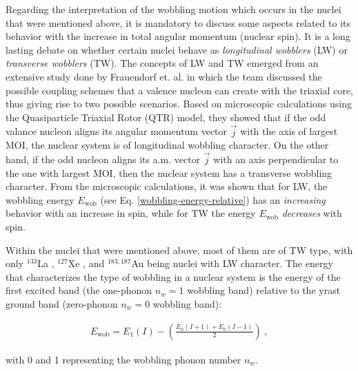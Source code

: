 \documentclass[11pt]{article}
\begin{document}
Regarding the interpretation of the wobbling motion which occurs in the nuclei that were mentioned above, it is mandatory to discuss some aspects related to its behavior with the increase in total angular momentum (nuclear spin). It is a long lasting debate on whether certain nuclei behave as \emph{longitudinal wobblers} (LW) or \emph{transverse wobblers} (TW). The concepts of LW and TW emerged from an extensive study done by Frauendorf et. al. \cite{frauendorf2014transverse} in which the team discussed the possible coupling schemes that a valence nucleon can create with the triaxial core, thus giving rise to two possible scenarios. Based on microscopic calculations using the Quasiparticle Triaxial Rotor (QTR) model, they showed that if the odd valance nucleon aligns its angular momentum vector $\vec{j}$ with the axis of largest MOI, the nuclear system is of longitudinal wobbling character. On the other hand, if the odd nucleon aligns its a.m. vector $\vec{j}$ with an axis perpendicular to the one with largest MOI, then the nuclear system has a transverse wobbling character. From the microscopic calculations, it was shown that for LW, the wobbling energy $E_\text{wob}$ (see Eq. \ref{wobbling-energy-relative}) has an \emph{increasing} behavior with an increase in spin, while for TW the energy $E_\text{wob}$ \emph{decreases} with spin.

Within the nuclei that were mentioned above, most of them are of TW type, with only $^{133}$La \cite{biswas2019longitudinal}, $^{127}$Xe \cite{chakraborty2020multiphonon}, and $^{183,187}$Au \cite{nandi2020first,sensharma2020longitudinal} being nuclei with LW character. The energy that characterizes the type of wobbling in a nuclear system is the energy of the first excited band (the one-phonon $n_w=1$ wobbling band) relative to the yrast ground band (zero-phonon $n_w=0$ wobbling band):

\begin{align}
    E_\text{wob}=E_{1}(I)-\left(\frac{E_0(I+1)+E_0(I-1)}{2}\right)\ ,
    \label{wobbling-energy-relative}
\end{align}

with 0 and 1 representing the wobbling phonon number $n_w$.
\end{document}
